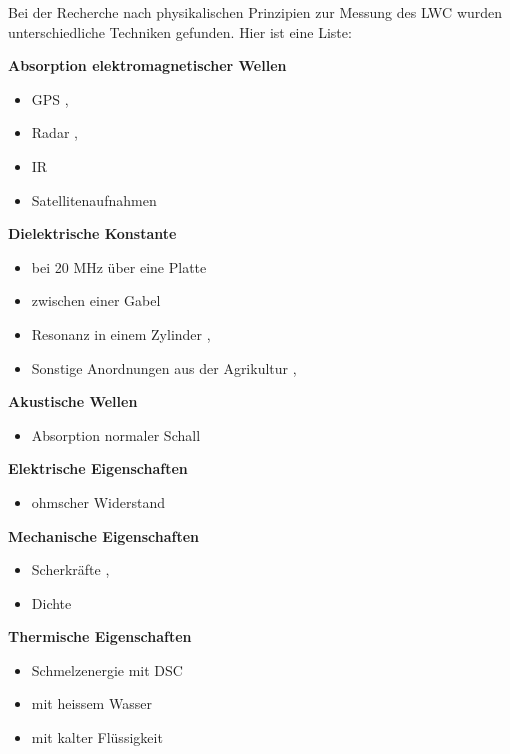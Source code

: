 Bei der Recherche nach physikalischen Prinzipien zur Messung des LWC wurden unterschiedliche Techniken gefunden. Hier ist eine Liste:


\textbf{Absorption elektromagnetischer Wellen}
\begin{itemize}
\item GPS \cite{Koch.2019}, \cite{Koch.2014}
\item Radar \cite{Bonnell.2021}, \cite{ilmsens-short-range-radar}
\item IR \cite{Donahue.2022}
\item Satellitenaufnahmen \cite{Tsang.2022}

\end{itemize}

\textbf{Dielektrische Konstante}
\begin{itemize}
\item bei 20 MHz über eine Platte \cite{slf}
\item zwischen einer Gabel \cite{fork}
\item Resonanz in einem Zylinder \cite{a2photonicsensors}, \cite{nasa-snowex-2020}
\item Sonstige Anordnungen aus der Agrikultur \cite{Mavrovic.2020}, \cite{PerezDiaz.2017}
\end{itemize}

\textbf{Akustische Wellen}
\begin{itemize}

\item Absorption normaler Schall \cite{Kinar.2007}

\end{itemize}


\textbf{Elektrische Eigenschaften}
\begin{itemize}
\item ohmscher Widerstand \cite{Abdelaal.2022}
\end{itemize}

\textbf{Mechanische Eigenschaften}
\begin{itemize}
\item Scherkräfte \cite{Hao.2021}, \cite{jstage-snow-density}
\item Dichte \cite{nasa-snow-density}

\end{itemize}

\textbf{Thermische Eigenschaften}
\begin{itemize}
\item Schmelzenergie mit DSC \cite{mt-density-meter}
\item mit heissem Wasser \cite{Fasani.2023}
\item mit kalter Flüssigkeit

\end{itemize}

